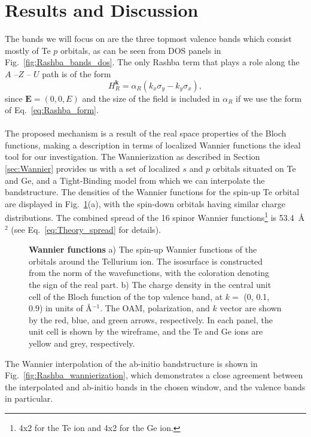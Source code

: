 \section{Results and Discussion}

The bands we will focus on are the three topmost valence bands which consist mostly of Te $p$ orbitals, as can be seen from DOS panels in Fig.~\ref{fig:Rashba_bands_dos}.
The only Rashba term that plays a role along the $A$ --$Z$ -- $U$ path is of the form
\begin{equation}
	H_R^{\bm k} = \alpha_R (k_x \sigma_y - k_y \sigma_x),
\end{equation}
since $\bm E = (0, 0, E)$ and the size of the field is included in $\alpha_R$ if we use the form of Eq.~\eqref{eq:Rashba_form}.
\\\\
The proposed mechanism is a result of the real space properties of the Bloch functions, making a description in terms of localized Wannier functions the ideal tool for our investigation.
The Wannierization as described in Section \ref{sec:Wannier} provides us with a set of localized $s$ and $p$ orbitals situated on Te and Ge, and a Tight-Binding model from which we can interpolate the bandstructure.
The densities of the Wannier functions for the spin-up Te orbital are displayed in Fig.~\ref{fig:Rashba_wannierfunctions}(a), with the spin-down orbitals having similar charge distributions.
The combined spread of the 16 spinor Wannier functions\footnote{4x2 for the Te ion and 4x2 for the Ge ion.} is 53.4~\AA$^2$ (see Eq.~\eqref{eq:Theory_spread} for details).
\begin{figure}
\caption{\label{fig:Rashba_wannierfunctions}{\bf Wannier functions} a) The spin-up Wannier functions of the orbitals around the Tellurium ion. The isosurface is constructed from the norm of the wavefunctions, with the coloration denoting the sign of the real part. b) The charge density in the central unit cell of the Bloch function of the top valence band, at $k=$ (0, 0.1, 0.9) in units of \AA$^{-1}$. The OAM, polarization, and $k$ vector are shown by the red, blue, and green arrows, respectively. In each panel, the unit cell is shown by the wireframe, and the Te and Ge ions are yellow and grey, respectively.}
\end{figure}
The Wannier interpolation of the ab-initio bandstructure is shown in Fig.~\ref{fig:Rashba_wannierization}, which demonstrates a close agreement between the interpolated and ab-initio bands in the chosen window, and the valence bands in particular. 
